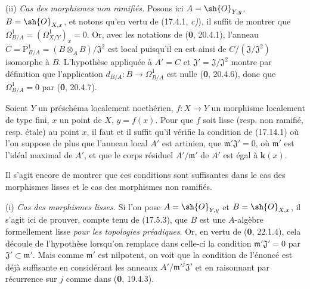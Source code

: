 (ii) \emph{Cas des morphismes non ramifiés.} Posons ici $A=\sh{O}_{Y,y}$, $B=\sh{O}_{X,x}$, et notons qu'en vertu de (17.4.1, \emph{c)}), il suffit de montrer que $\Omega^1_{B/A}=(\varOmega^1_{X/Y})_x=0$. Or, avec les notations de (\textbf{0}, 20.4.1), l'anneau $C=\mathrm{P}^1_{B/A}=(B\otimes_A B)/\mathfrak{J}^2$ est local puisqu'il en est ainsi de $C/(\mathfrak{J}/\mathfrak{J}^2)$ isomorphe à $B$. L'hypothèse appliquée à $A'=C$ et $\mathfrak{J}'=\mathfrak{J}/\mathfrak{J}^2$ montre par définition que l'application $d_{B/A}:B\to\Omega^1_{B/A}$ est nulle (\textbf{0}, 20.4.6), donc que $\Omega^1_{B/A}=0$ par (\textbf{0}, 20.4.7).

\begin{proposition}[17.14.2]
\label{IV.17.14.2}
Soient $Y$ un préschéma \textup{localement noethérien}, $f:X\to Y$ un morphisme localement de type fini, $x$ un point de $X$, $y=f(x)$. Pour que $f$ soit lisse \textup{(resp.} non ramifié, \textup{resp.} étale\textup{)} au point $x$, il faut et il suffit qu'il vérifie la condition de \textup{(17.14.1)} où l'on suppose de plus que l'anneau local $A'$ est \textup{artinien}, que $\mathfrak m'\mathfrak{J}'=0$, où $\mathfrak m'$ est l'idéal maximal de $A'$, et que le corps résiduel $A'/\mathfrak m'$ de $A'$ est \textup{égal à} $\boldsymbol{k}(x)$.
\end{proposition}

Il s'agit encore de montrer que ces conditions sont suffisantes dans le cas des morphismes lisses et le cas des morphismes non ramifiés.


(i) \emph{Cas des morphismes lisses.} Si l'on pose $A=\sh{O}_{Y,y}$ et $B=\sh{O}_{X,x}$, il s'agit ici de prouver, compte tenu de (17.5.3), que $B$ est une $A$-algèbre formellement lisse \emph{pour les topologies préadiques}. Or, en vertu de (\textbf{0}, 22.1.4), cela découle de l'hypothèse lorsqu'on remplace dans celle-ci la condition $\mathfrak m'\mathfrak{J}'=0$ par $\mathfrak{J}'\subset\mathfrak m'$. Mais comme $\mathfrak m'$ est nilpotent, on voit que la condition de l'énoncé est déjà suffisante en considérant les anneaux $A'/\mathfrak m'^{j}\mathfrak{J}'$ et en raisonnant par récurrence sur $j$ comme dans (\textbf{0}, 19.4.3).

